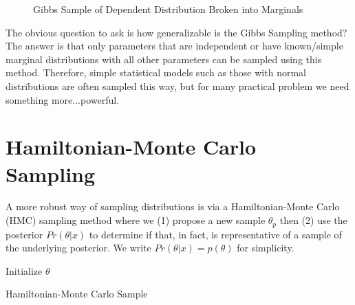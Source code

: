 \documentclass[12pt]{article}
\begin{document}
\begin{figure}[h]
\centering
{}
\caption{Gibbs Sample of Dependent Distribution Broken into Marginals}
\end{figure}

\vspace{5mm}

The obvious question to ask is how generalizable is the Gibbs Sampling method? The answer is that only parameters that are independent or have known/simple marginal distributions with all other parameters can be sampled using this method. Therefore, simple statistical models such as those with normal distributions are often sampled this way, but for many practical problem we need something more...powerful.

\section{Hamiltonian-Monte Carlo Sampling}

A more robust way of sampling distributions is via a Hamiltonian-Monte Carlo (HMC) sampling method where we (1) propose a new sample $\theta_p$ then (2) use the posterior $Pr(\theta | x)$ to determine if that, in fact, is representative of a sample of the underlying posterior. We write $Pr(\theta | x)=p(\theta)$ for simplicity.

\vspace{5mm}

\begin{algorithm}[H]
Initialize $\theta$\;
 \caption{Hamiltonian-Monte Carlo Sample}
\end{algorithm}
\end{document}
